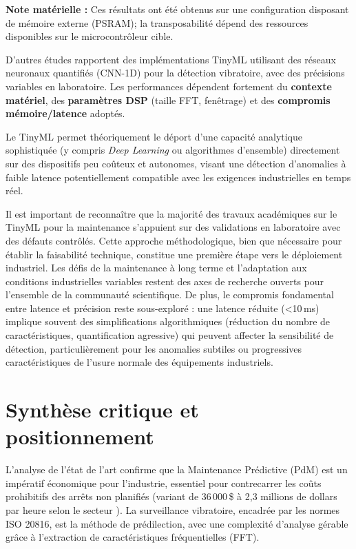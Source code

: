 \textbf{Note matérielle :} Ces résultats ont été obtenus sur une configuration disposant de mémoire externe (PSRAM); la transposabilité dépend des ressources disponibles sur le microcontrôleur cible.

D'autres études \cite{arciniegas2025,langer2025,gupta2025} rapportent des implémentations TinyML utilisant des réseaux neuronaux quantifiés (CNN-1D) pour la détection vibratoire, avec des précisions variables en laboratoire. Les performances dépendent fortement du \textbf{contexte matériel}, des \textbf{paramètres DSP} (taille FFT, fenêtrage) et des \textbf{compromis mémoire/latence} adoptés.

Le TinyML permet théoriquement le déport d'une capacité analytique sophistiquée (y compris \textit{Deep Learning} ou algorithmes d'ensemble) directement sur des dispositifs peu coûteux et autonomes, visant une détection d'anomalies à faible latence potentiellement compatible avec les exigences industrielles en temps réel.

Il est important de reconnaître que la majorité des travaux académiques sur le TinyML pour la maintenance s'appuient sur des validations en laboratoire avec des défauts contrôlés. Cette approche méthodologique, bien que nécessaire pour établir la faisabilité technique, constitue une première étape vers le déploiement industriel. Les défis de la maintenance à long terme et l'adaptation aux conditions industrielles variables restent des axes de recherche ouverts pour l'ensemble de la communauté scientifique. De plus, le compromis fondamental entre latence et précision reste sous-exploré : une latence réduite (<10\,ms) implique souvent des simplifications algorithmiques (réduction du nombre de caractéristiques, quantification agressive) qui peuvent affecter la sensibilité de détection, particulièrement pour les anomalies subtiles ou progressives caractéristiques de l'usure normale des équipements industriels.

\section{Synthèse critique et positionnement}
\label{sec:synthese_critique}

L'analyse de l'état de l'art confirme que la Maintenance Prédictive (PdM) est un impératif économique pour l'industrie, essentiel pour contrecarrer les coûts prohibitifs des arrêts non planifiés (variant de 36\,000\,\$ à 2,3 millions de dollars par heure selon le secteur \cite{siemens2024}). La surveillance vibratoire, encadrée par les normes ISO 20816, est la méthode de prédilection, avec une complexité d'analyse gérable grâce à l'extraction de caractéristiques fréquentielles (FFT).

